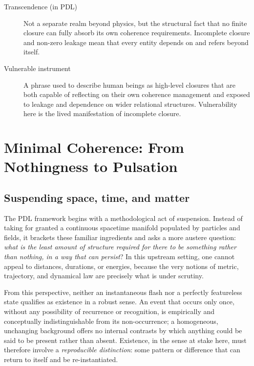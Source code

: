 \documentclass[11pt,a4paper]{article}
\theoremstyle{definition}
\begin{document}
\begin{description}
\item[Transcendence (in PDL)]
Not a separate realm beyond physics, but the structural fact that no finite closure can fully absorb its own coherence requirements. Incomplete closure and non-zero leakage mean that every entity depends on and refers beyond itself.\cite{Laubscher_Existence_PulsatingClosure_2026,Laubscher_PDL_TO_Dialogue_2024}

\item[Vulnerable instrument]
A phrase used to describe human beings as high-level closures that are both capable of reflecting on their own coherence management and exposed to leakage and dependence on wider relational structures. Vulnerability here is the lived manifestation of incomplete closure.\cite{Laubscher_Existence_PulsatingClosure_2026}

\end{description}

\section{Minimal Coherence: From Nothingness to Pulsation}
\label{sec:minimal_coherence}

\subsection{Suspending space, time, and matter}

The PDL framework begins with a methodological act of suspension. Instead of taking for granted a continuous spacetime manifold populated by particles and fields, it brackets these familiar ingredients and asks a more austere question: \emph{what is the least amount of structure required for there to be something rather than nothing, in a way that can persist}? \cite{Laubscher_IntroPDL_2024,Laubscher_EmergencePhysicalReality_2024,Laubscher_Existence_PulsatingClosure_2026} In this upstream setting, one cannot appeal to distances, durations, or energies, because the very notions of metric, trajectory, and dynamical law are precisely what is under scrutiny.

From this perspective, neither an instantaneous flash nor a perfectly featureless state qualifies as existence in a robust sense. An event that occurs only once, without any possibility of recurrence or recognition, is empirically and conceptually indistinguishable from its non-occurrence; a homogeneous, unchanging background offers no internal contrasts by which anything could be said to be present rather than absent.\cite{Laubscher_Existence_PulsatingClosure_2026} Existence, in the sense at stake here, must therefore involve a \emph{reproducible distinction}: some pattern or difference that can return to itself and be re-instantiated.
\end{document}
